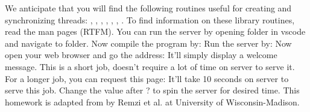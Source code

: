 {}We anticipate that you will find the following routines useful for creating and synchronizing threads: , , , , , , . To find information on these library routines, read the man pages (RTFM). \markdownRendererInterblockSeparator
{}\markdownRendererInterblockSeparator
{}You can run the server by opening folder in vscode and navigate to  folder. Now compile the program by:\markdownRendererInterblockSeparator
{}\markdownRendererInterblockSeparator
{}Run the server by:\markdownRendererInterblockSeparator
{}\markdownRendererInterblockSeparator
{}Now open your web browser and go the address:\markdownRendererInterblockSeparator
{}\markdownRendererInterblockSeparator
{}It'll simply display a welcome message. This is a short job, doesn't require a lot of time on server to serve it. For a longer job, you can request this page:\markdownRendererInterblockSeparator
{}\markdownRendererInterblockSeparator
{}It'll take 10 seconds on server to serve this job. Change the value after ? to spin the server for desired time.\markdownRendererInterblockSeparator
{}\markdownRendererInterblockSeparator
{}This homework is adapted from  by Remzi et al. at University of Wisconsin-Madison.\markdownRendererDocumentEnd
